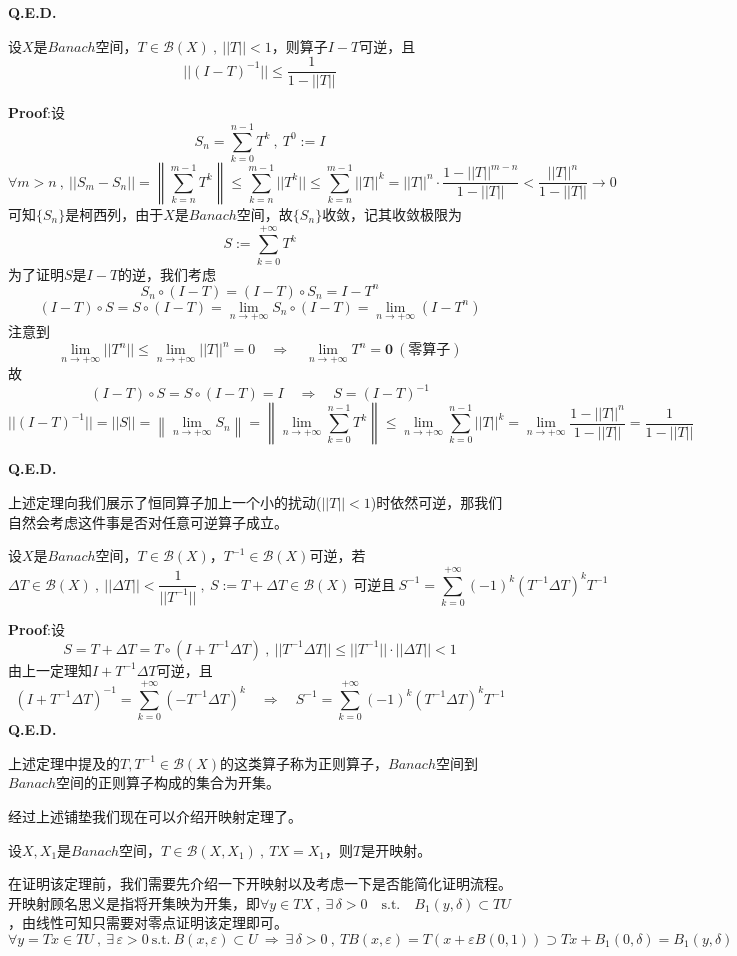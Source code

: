 \textbf{Q.E.D.} 
\begin{theorem}
    设$X$是$Banach$空间，$T \in \mathscr{B}(X) \ , \ ||T||<1$，则算子$I-T$可逆，且
    \[||(I-T)^{-1}|| \leq \frac{1}{1-||T||}\]
\end{theorem} 
\textbf{Proof}:设
\[S_n=\sum_{k=0}^{n-1}T^k \ , \ T^0:=I\]
\[\forall m>n \ , \ ||S_m-S_n||=\left\|\sum_{k=n}^{m-1}T^k\right\| \leq \sum_{k=n}^{m-1}||T^k|| \leq \sum_{k=n}^{m-1}||T||^k=||T||^n \cdot \frac{1-||T||^{m-n}}{1-||T||}<\frac{||T||^n}{1-||T||} \to 0\]
可知$\{S_n\}$是柯西列，由于$X$是$Banach$空间，故$\{S_n\}$收敛，记其收敛极限为
\[S:=\sum_{k=0}^{+\infty}T^k\]
为了证明$S$是$I-T$的逆，我们考虑
\[S_n \circ (I-T)=(I-T) \circ S_n=I-T^n\]
\[(I-T) \circ S=S \circ (I-T)=\lim_{n \to +\infty}S_n \circ (I-T)=\lim_{n \to +\infty}(I-T^n)\]
注意到
\[\lim_{n \to +\infty}||T^n|| \leq \lim_{n \to +\infty}||T||^n=0 \quad \Rightarrow \quad \lim_{n \to +\infty}T^n=\mathbf{0} \ (\text{零算子})\]
故
\[(I-T) \circ S=S \circ (I-T)=I \quad \Rightarrow \quad S=(I-T)^{-1}\]
\[||(I-T)^{-1}||=||S||=\left\|\lim_{n \to +\infty}S_n\right\|=\left\|\lim_{n \to +\infty}\sum_{k=0}^{n-1}T^k\right\| \leq \lim_{n \to +\infty}\sum_{k=0}^{n-1}||T||^k=\lim_{n \to +\infty}\frac{1-||T||^n}{1-||T||}=\frac{1}{1-||T||}\]

\textbf{Q.E.D.}

上述定理向我们展示了恒同算子加上一个小的扰动($||T||<1$)时依然可逆，那我们自然会考虑这件事是否对任意可逆算子成立。
\begin{theorem}
    设$X$是$Banach$空间，$T \in \mathscr{B}(X)$，$T^{-1} \in \mathscr{B}(X)$可逆，若
    \[\Delta T \in \mathscr{B}(X) \ , \ ||\Delta T||<\frac{1}{||T^{-1}||} \ , \ S:=T+\Delta T \in \mathscr{B}(X) \ \text{可逆且} \ S^{-1}=\sum_{k=0}^{+\infty}(-1)^k(T^{-1}\Delta T)^kT^{-1}\]
\end{theorem} 
\textbf{Proof}:设
\[S=T+\Delta T=T \circ (I+T^{-1}\Delta T) \ , \ ||T^{-1}\Delta T|| \leq ||T^{-1}|| \cdot ||\Delta T||<1\]
由上一定理知$I+T^{-1}\Delta T$可逆，且
\[(I+T^{-1}\Delta T)^{-1}=\sum_{k=0}^{+\infty}(-T^{-1}\Delta T)^k \quad \Rightarrow \quad S^{-1}=\sum_{k=0}^{+\infty}(-1)^k(T^{-1}\Delta T)^kT^{-1}\]
\textbf{Q.E.D.}

上述定理中提及的$T,T^{-1} \in \mathscr{B}(X)$的这类算子称为正则算子，$Banach$空间到$Banach$空间的正则算子构成的集合为开集。

经过上述铺垫我们现在可以介绍开映射定理了。
\begin{theorem}[开映射定理]
    设$X,X_1$是$Banach$空间，$T \in \mathscr{B}(X,X_1) \ , \ TX=X_1$，则$T$是开映射。
\end{theorem} 
在证明该定理前，我们需要先介绍一下开映射以及考虑一下是否能简化证明流程。开映射顾名思义是指将开集映为开集，即$\forall y \in TX \ , \ \exists \, \delta>0 \quad \text{s.t.} \quad B_1(y,\delta) \subset TU$，由线性可知只需要对零点证明该定理即可。
\[\forall y=Tx \in TU \ , \ \exists \, \varepsilon>0 \ \text{s.t.} \ B(x,\varepsilon) \subset U \ \Rightarrow \ \exists \, \delta>0 \ , \ TB(x,\varepsilon)=T(x+\varepsilon B(0,1)) \supset Tx+B_1(0,\delta)=B_1(y,\delta)\]

